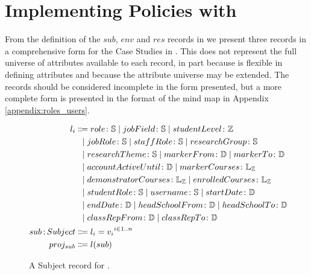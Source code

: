 \section{Implementing Policies with \thePolicyLang}
\label{sec:design_impl_pol_lang}

From the definition of the $sub$, $env$ and $res$ records in  we present three records in a comprehensive form for the Case Studies in . This does not represent the full universe of attributes available to each record, in part because \OpenABE is flexible in defining attributes and because the attribute universe may be extended. The records should be considered incomplete in the form presented, but a more complete form is presented in the format of the mind map in Appendix \ref{appendix:roles_users}.

\begin{figure}[ht]
  \centering
\begin{align*}
  l_{i}
  &
    \Coloneqq
    role \colon \mathbb{S}
    \alt
    jobField \colon \mathbb{S}
    \alt
    studentLevel \colon \mathbb{Z}
  \\
  &
    \firstAlt
    jobRole \colon \mathbb{S}
    \alt
    staffRole \colon \mathbb{S}
    \alt
    researchGroup \colon \mathbb{S}
  \\
  &
    \firstAlt
    researchTheme \colon \mathbb{S}
    \alt
    markerFrom \colon \mathbb{D}
    \alt
    markerTo \colon \mathbb{D}
  \\
  &
    \firstAlt
    accountActiveUntil \colon \mathbb{D}
    \alt
    markerCourses \colon \mathbb{L}_{\mathbb{Z}}
  \\
  &
    \firstAlt
    demonstratorCourses \colon \mathbb{L}_{\mathbb{Z}}
    \alt
    enrolledCourses \colon \mathbb{L}_{\mathbb{Z}}
  \\
  &
    \firstAlt
    studentRole \colon \mathbb{S}
    \alt
    username \colon \mathbb{S}
    \alt
    startDate \colon \mathbb{D}
  \\
  &
    \firstAlt
    endDate \colon \mathbb{D}
    \alt
    headSchoolFrom \colon \mathbb{D}
    \alt
    headSchoolTo \colon \mathbb{D}
  \\
  &
    \firstAlt
    classRepFrom \colon \mathbb{D}
    \alt
    classRepTo \colon \mathbb{D}
  \\
  \ty{sub}{Subject}
  &
    \Coloneqq
    { l_{i} = v_{i}}^{i\in 1..n}
  \\
  proj_{sub}
  &
    \Coloneqq
    l(sub)
\end{align*}
  \caption{
    \label{fig:case_sub_record}
    A Subject record for \thePolicyLang.
  }
\end{figure}

